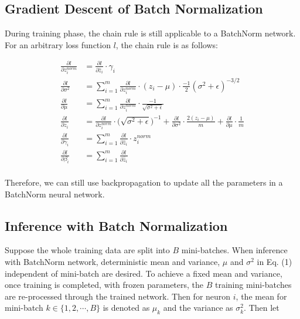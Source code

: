 \documentclass{article}
\begin{document}
\subsection{Gradient Descent of Batch Normalization}

During training phase, the chain rule is still applicable to a BatchNorm network. For an arbitrary loss function $l$, the chain rule is as follows:

\begin{align*}
   \frac{\partial l}{\partial z_i^{norm}} &= \frac{\partial l}{\partial \hat{z}_i}\cdot\gamma_i\\
   \frac{\partial l}{\partial \sigma^2}  &= \sum_{i=1}^m\frac{\partial l}{\partial z_i^{norm}}\cdot(z_i-\mu)\cdot\frac{-1}{2}(\sigma^2+\epsilon)^{-3/2} \\
   \frac{\partial l}{\partial \mu}  &= \sum_{i=1}^m\frac{\partial l}{\partial z_i^{norm}}\cdot \frac{-1}{\sqrt{\sigma^2+\epsilon}}\\
   \frac{\partial l}{\partial z_i}  &=  \frac{\partial l}{\partial z_i^{norm}} \cdot\bigg(\sqrt{\sigma^2+\epsilon}\bigg)^{-1} + \frac{\partial l}{\partial \sigma^2}\cdot\frac{2(z_i-\mu)}{m} +  \frac{\partial l}{\partial \mu}\cdot\frac{1}{m}\\
   \frac{\partial l}{\partial \gamma_i}  &=  \sum_{i=1}^m\frac{\partial l}{\partial \hat{z}_i}\cdot z_i^{norm} \\
   \frac{\partial l}{\partial \beta_i}  &= \sum_{i=1}^m\frac{\partial l}{\partial \hat{z}_i} \\
\end{align*}

Therefore, we can still use backpropagation to update all the parameters in a BatchNorm neural network.

\subsection{Inference with Batch Normalization}

Suppose the whole training data are split into $B$ mini-batches. When inference with BatchNorm network, deterministic mean and variance, $\mu$ and $\sigma^2$ in Eq. (1) independent of mini-batch are desired. To achieve a fixed mean and variance, once training is completed, with frozen parameters, the $B$ training mini-batches are re-processed through the trained network. Then for neuron $i$, the mean for mini-batch $k\in\{1,2,\cdots,B\}$ is denoted as $\mu_k$ and the variance as $\sigma^2_k$. Then let
\end{document}
